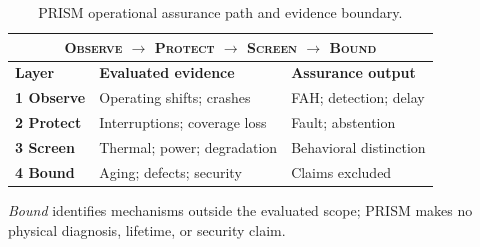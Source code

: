 \begin{table}[!b]
\centering
\caption{PRISM operational assurance path and evidence boundary.}
\label{tab:prism_scope}

{\scriptsize
\renewcommand{\arraystretch}{1.12}
\setlength{\tabcolsep}{2.0pt}

\begin{tabular*}{\columnwidth}{@{\extracolsep{\fill}}lll@{}}
\toprule

\multicolumn{3}{c}{
\textsc{Observe \(\rightarrow\) Protect \(\rightarrow\) Screen
\(\rightarrow\) Bound}
} \\

\midrule

\textbf{Layer} &
\textbf{Evaluated evidence} &
\textbf{Assurance output} \\

\midrule

\textbf{1 Observe}
& Operating shifts; crashes
& FAH; detection; delay \\

\textbf{2 Protect}
& Interruptions; coverage loss
& Fault; abstention \\

\textbf{3 Screen}
& Thermal; power; degradation
& Behavioral distinction \\

\textbf{4 Bound}
& Aging; defects; security
& Claims excluded \\

\bottomrule
\end{tabular*}
}

\vspace{2pt}
{\scriptsize\raggedright
\emph{Bound} identifies mechanisms outside the evaluated scope; PRISM
makes no physical diagnosis, lifetime, or security claim.
\par}
\end{table}
